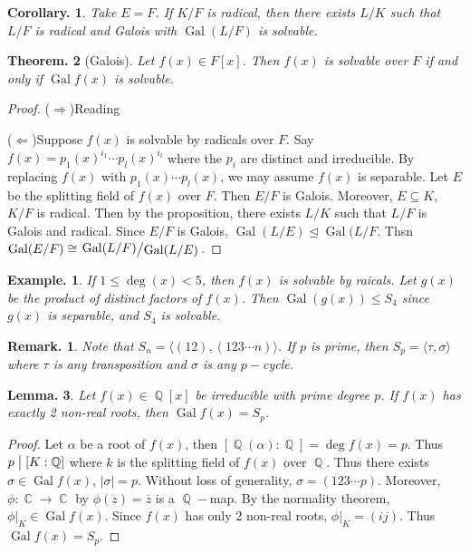 \documentclass[11pt, a4paper]{memoir}
\DeclareMathOperator{\Q}{{\mathbb{Q}}}
\DeclareMathOperator{\C}{{\mathbb{C}}}
\newcommand{\impr}{{($\Rightarrow$)\hspace{0.2cm}}}
\newcommand{\impl}{{($\Leftarrow$)\hspace{0.2cm}}}
\renewcommand{\div}{\bigm|}
\theoremstyle{change}
\newtheorem{theorem}{Theorem.}[section]
\newtheorem{lemma}[theorem]{Lemma.}
\newtheorem{corollary}[theorem]{Corollary.}
\theoremstyle{plain}
\theoremstyle{nonumberplain}
\newtheorem{example}{Example.}
\newtheorem{remark}{Remark.}
\newtheorem{proof}{Proof}
\DeclareMathOperator{\Gal}{Gal}
\newcommand{\quot}[2]{\mathchoice{\left.\raisebox{0.14em}{$#1$}\middle/\raisebox{-0.14em}{$#2$}\right.}
                                 {\left.\raisebox{0.08em}{$#1$}\middle/\raisebox{-0.08em}{$#2$}\right.}
                                 {\left.\raisebox{0.03em}{$#1$}\middle/\raisebox{-0.03em}{$#2$}\right.}
                                 {\left.\raisebox{0em}{$#1$}\middle/\raisebox{0em}{$#2$}\right.}}
\numberwithin{equation}{section}
\begin{document}
\begin{corollary}
    Take $E=F$.
    If $K/F$ is radical, then there exists $L/K$ such that $L/F$ is radical and Galois with $\Gal(L/F)$ is solvable.
\end{corollary}
\begin{theorem}[Galois]
    Let $f(x)\in F[x]$.
    Then $f(x)$ is solvable over $F$ if and only if $\Gal f(x)$ is solvable.
\end{theorem}
\begin{proof}
    \impr Reading

    \impl Suppose $f(x)$ is solvable by radicals over $F$.
    Say $f(x)=p_1(x)^{i_1}\cdots p_l(x)^{i_l}$ where the $p_i$ are distinct and irreducible.
    By replacing $f(x)$ with $p_1(x)\cdots p_l(x)$, we may assume $f(x)$ is separable.
    Let $E$ be the splitting field of $f(x)$ over $F$.
    Then $E/F$ is Galois.
    Moreover, $E\subseteq K$, $K/F$ is radical.
    Then by the proposition, there exists $L/K$ such that $L/F$ is Galois and radical.
    Since $E/F$ is Galois, $\Gal(L/E)\trianglelefteq\Gal(L/F$.
    Thsn $\Gal(E/F)\cong\quot{\Gal(L/F)}{\Gal(L/E)}$.
\end{proof}
\begin{example}
    If $1\leq\deg (x)<5$, then $f(x)$ is solvable by raicals.
    Let $g(x)$ be the product of distinct factors of $f(x)$.
    Then $\Gal(g(x))\leq S_4$ since $g(x)$ is separable, and $S_4$ is solvable.
\end{example}
\begin{remark}
    Note that $S_n=\langle(12),(123\cdots n)\rangle$.
    If $p$ is prime, then $S_p=\langle\tau,\sigma\rangle$ where $\tau$ is any transposition and $\sigma$ is any $p-$cycle.
\end{remark}
\begin{lemma}
    Let $f(x)\in\Q[x]$ be irreducible with prime degree $p$.
    If $f(x)$ has exactly 2 non-real roots, then $\Gal f(x)=S_p$.
\end{lemma}
\begin{proof}
    Let $\alpha$ be a root of $f(x)$, then $[\Q(\alpha):\Q]=\deg f(x)=p$.
    Thus $p\div[K:\Q]$ where $k$ is the splitting field of $f(x)$ over $\Q$.
    Thus there exists $\sigma\in\Gal f(x)$, $|\sigma|=p$.
    Without loss of generality, $\sigma=(123\cdots p)$.
    Moreover, $\phi:\C\to\C$ by $\phi(z)=\overline{z}$ is a $\Q-$map.
    By the normality theorem, $\phi|_K\in\Gal f(x)$.
    Since $f(x)$ has only 2 non-real roots, $\phi|_K=(ij)$.
    Thus $\Gal f(x)=S_p$.
\end{proof}
\end{document}
